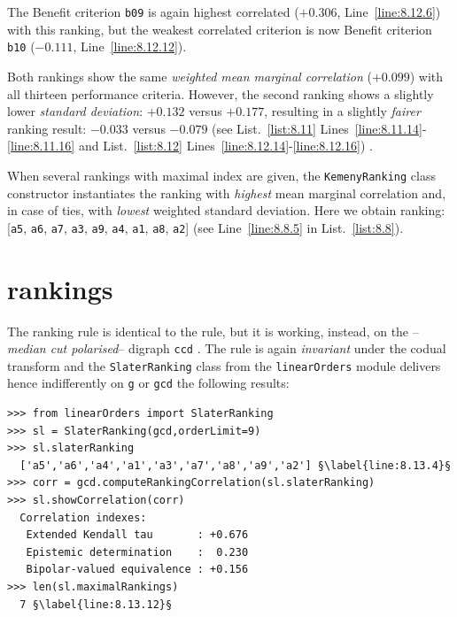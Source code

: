 The Benefit criterion \texttt{b09} is again highest correlated ($+0.306$, Line~\ref{line:8.12.6}) with this \Kemeny ranking, but the weakest correlated criterion is now Benefit criterion \texttt{b10} ($-0.111$, Line~\ref{line:8.12.12}).

Both \Kemeny rankings show the same \emph{weighted mean marginal correlation} ($+0.099$) with all thirteen performance criteria. However, the second ranking shows a slightly lower \emph{standard deviation}: $+0.132$ versus $+0.177$, resulting in a slightly \emph{fairer} ranking result: $-0.033$ versus $-0.079$ (see List.~\vref{list:8.11} Lines~\ref{line:8.11.14}-\ref{line:8.11.16} and List.~\ref{list:8.12} Lines~\ref{line:8.12.14}-\ref{line:8.12.16}) .

When several rankings with maximal \Kemeny index are given, the \texttt{Kemeny\-Ranking} class constructor instantiates the ranking with \emph{highest} mean marginal correlation and, in case of ties, with \emph{lowest} weighted standard deviation. Here we obtain ranking: [\texttt{a5}, \texttt{a6}, \texttt{a7}, \texttt{a3}, \texttt{a9}, \texttt{a4}, \texttt{a1}, \texttt{a8}, \texttt{a2}] (see Line~\ref{line:8.8.5} in List.~\vref{list:8.8}).

\section{\Slater rankings}
\label{sec:8.5}

The \Slater ranking rule is identical to the \Kemeny rule, but it is working, instead, on the \Condorcet --\emph{median cut polarised}-- digraph \texttt{ccd} \citep{SLA-1961}. The \Slater rule is again \emph{invariant} under the codual transform and the \texttt{SlaterRanking} class from the \texttt{linearOrders} module delivers hence indifferently on \texttt{g} or \texttt{gcd} the following results:
\begin{lstlisting}[caption={Computing a \Slater ranking},label=list:8.13]   
>>> from linearOrders import SlaterRanking
>>> sl = SlaterRanking(gcd,orderLimit=9)
>>> sl.slaterRanking
  ['a5','a6','a4','a1','a3','a7','a8','a9','a2'] §\label{line:8.13.4}§
>>> corr = gcd.computeRankingCorrelation(sl.slaterRanking)
>>> sl.showCorrelation(corr)
  Correlation indexes:
   Extended Kendall tau       : +0.676
   Epistemic determination    :  0.230
   Bipolar-valued equivalence : +0.156
>>> len(sl.maximalRankings)
  7 §\label{line:8.13.12}§
\end{lstlisting}

